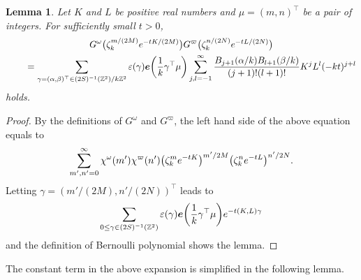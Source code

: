 \documentclass[11pt]{article}
\numberwithin{equation}{section}
\newcommand{\veps}{\varepsilon}
\newcommand{\Z}{\mathbb{Z}}
\numberwithin{equation}{section}
\newtheorem{lem}[Theorem]{Lemma}
\newcommand{\trans}[1]{#1^\top}
\begin{document}
\begin{lem} \label{lem:G(z)_asymptotic}
	Let $ K $ and $ L$ be positive real numbers and $\mu = \trans{(m, n)}$ be a pair of integers.
	For sufficiently small $t > 0$,
	\begin{gather*}
		G^\omega\big(\zeta_k^{m/(2M)} {\rm e}^{-tK/(2M)}\big) G^\varpi\big(\zeta_k^{n/(2N)} {\rm e}^{-tL/(2N)}\big)
\\ \qquad
	{}	= 		\sum_{\gamma = \trans{(\alpha, \beta)} \in (2S)^{-1}(\Z^2)/k\Z^2} \veps(\gamma) \bm{e}\bigg(\frac{1}{k} {\trans{\gamma}} \mu\bigg)
		\sum_{j,l = -1}^\infty \frac{B_{j+1}(\alpha/k) B_{l+1}(\beta/k)}{(j+1)! (l+1)!} K^j L^l (-kt)^{j+l}
	\end{gather*}
	holds.
\end{lem}
\begin{proof}
	By the definitions of $G^\omega$ and $G^\varpi$, the left hand side of the above equation equals to
	\begin{gather*}
	\sum_{m', n' = 0}^\infty \chi^\omega(m') \chi^\varpi(n')
	\big(\zeta_k^{m} {\rm e}^{-tK}\big)^{m'/2M} \big(\zeta_k^{n} {\rm e}^{-tL}\big)^{n'/2N}.
	\end{gather*}
	Letting $ \gamma = \trans{(m'/(2M), n'/(2N))} $ leads to
	\begin{gather*}
	\sum_{0 \le \gamma \in (2S)^{-1}(\Z^2)} \veps(\gamma) \bm{e}\bigg( \frac{1}{k} \trans{\gamma} \mu \bigg)
	{\rm e}^{-t (K, L) \gamma}
	\end{gather*}
	and the definition of Bernoulli polynomial shows the lemma.
\end{proof}

The constant term in the above expansion is simplified in the following lemma.
\end{document}
